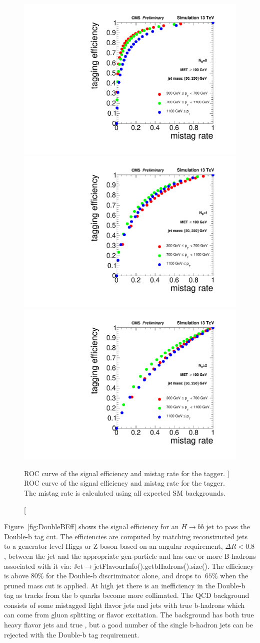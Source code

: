 \begin{figure}
  \begin{center}
    \includegraphics[width=0.32\linewidth]{figs/roc0b.pdf} 
    \includegraphics[width=0.32\linewidth]{figs/roc1b.pdf}
    \includegraphics[width=0.32\linewidth]{figs/roc2b.pdf}
\caption
[ROC curve of the signal efficiency and mistag rate for the \bbbar tagger. ]
{ROC curve of the signal efficiency and mistag rate for the \bbbar tagger. The mistag rate is calculated using all expected SM backgrounds.}
    \label{fig:DoubleBROCBHadrons}
  \end{center}
\end{figure}

Figure~\ref{fig:DoubleBEff} shows the signal efficiency for an $H\rightarrow b\bar{b}$ jet to pass the Double-b tag cut. The efficiencies are computed by matching reconstructed jets to a 
generator-level Higgs or Z boson based on an angular requirement, $\Delta R<0.8$, between the jet and the appropriate gen-particle and has one or more B-hadrons associated with it via: Jet$\rightarrow$jetFlavourInfo().getbHadrons().size().
The efficiency is above $80\%$ for the Double-b discriminator alone, and drops to $~65\%$ when the pruned mass cut is applied. At high jet \pt there is an inefficiency in the 
Double-b tag as tracks from the b quarks become more collimated. The QCD background consists of some mistagged light flavor jets and jets with true b-hadrons which can come from gluon splitting or flavor excitation. The \ttbar background has both true heavy flavor jets and true \ptmiss, but a good number of the single b-hadron jets can be rejected with the Double-b tag requirement.

